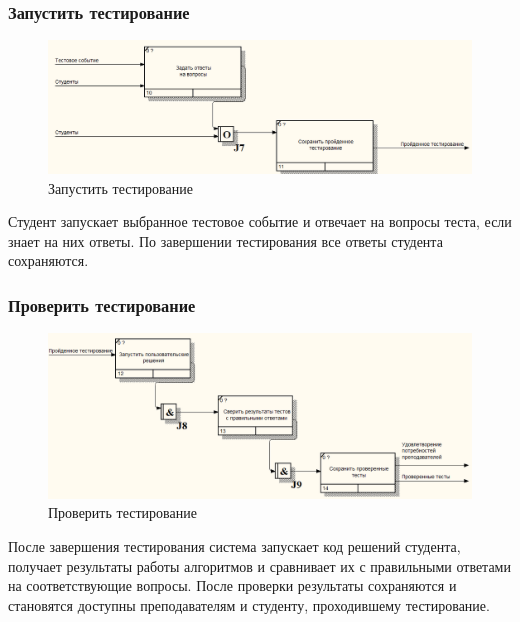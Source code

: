 \subsubsection{Запустить тестирование}
\begin{figure}[H]
    \includegraphics[width=\textwidth, center]{../img/idef3/RunTest.png}
    \caption{Запустить тестирование}
\end{figure}

Студент запускает выбранное тестовое событие и отвечает на вопросы теста,
если знает на них ответы. По завершении тестирования все ответы студента сохраняются.

\subsubsection{Проверить тестирование}
\begin{figure}[H]
    \includegraphics[width=\textwidth, center]{../img/idef3/ValidateTest.png}
    \caption{Проверить тестирование}
\end{figure}

После завершения тестирования система запускает код решений студента, получает
результаты работы алгоритмов и сравнивает их с правильными ответами на соответствующие вопросы.
После проверки результаты сохраняются и становятся доступны преподавателям и студенту,
проходившему тестирование.

